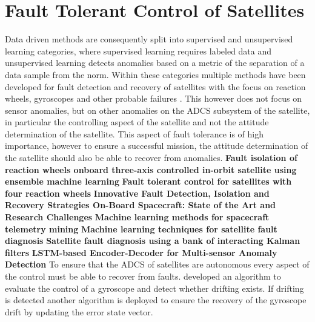 \section{Fault Tolerant Control of Satellites}
Data driven methods are consequently split into supervised and unsupervised learning categories, where supervised learning requires labeled data and unsupervised learning detects anomalies based on a metric of the separation of a data sample from the norm. Within these categories multiple methods have been developed for fault detection and recovery of satellites with the focus on reaction wheels, gyroscopes and other probable failures \cite{Tudoroiu2007, Pilastre2020, rahimi2020fault, jin2008fault, wander2013innovative, ibrahim2018machine, ibrahim2020machine}. This however does not focus on sensor anomalies, but on other anomalies on the ADCS subsystem of the satellite, in particular the controlling aspect of the satellite and not the attitude determination of the satellite. This aspect of fault tolerance is of high importance, however to ensure a successful mission, the attitude determination of the satellite should also be able to recover from anomalies.
\textbf{Fault isolation of reaction wheels onboard three-axis controlled in-orbit satellite using ensemble machine learning}
\cite{rahimi2020fault}
\textbf{Fault tolerant control for satellites with four reaction wheels}
\cite{jin2008fault}
\textbf{Innovative Fault Detection, Isolation and Recovery Strategies On-Board Spacecraft: State of the Art and Research Challenges}
\cite{wander2013innovative}
\textbf{Machine learning methods for spacecraft telemetry mining}
\cite{ibrahim2018machine}
\textbf{Machine learning techniques for satellite fault diagnosis}
\cite{ibrahim2020machine}
\textbf{Satellite fault diagnosis using a bank of interacting Kalman filters}
\cite{Tudoroiu2007}
\textbf{LSTM-based Encoder-Decoder for Multi-sensor Anomaly Detection}
\cite{Malhotra2016}
To ensure that the ADCS of satellites are autonomous every aspect of the control must be able to recover from faults. \cite{carvajal2017agent} developed an algorithm to evaluate the control of a gyroscope and detect whether drifting exists. If drifting is detected another algorithm is deployed to ensure the recovery of the gyroscope drift by updating the error state vector.

